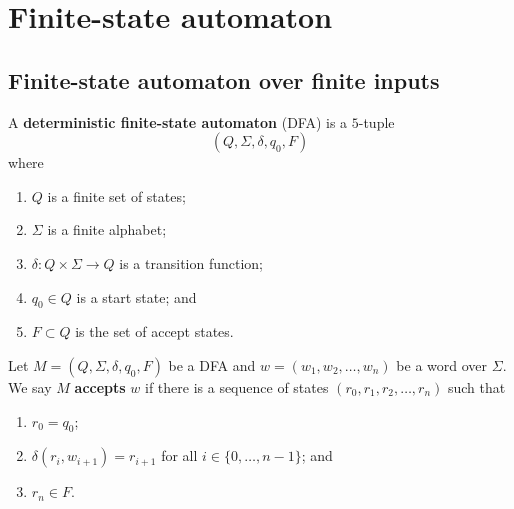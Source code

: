 \chapter{Finite-state automaton}
\section{Finite-state automaton over finite inputs}

\begin{definition}
    A \textbf{deterministic finite-state automaton} (DFA) is a $5$-tuple
    \[ (Q, \Sigma, \delta, q_0, F) \]
    where
    \begin{enumerate}
        \item $Q$ is a finite set of states;
        \item $\Sigma$ is a finite alphabet;
        \item $\delta: Q \times \Sigma \to Q$ is a transition function;
        \item $q_0 \in Q$ is a start state; and
        \item $F \subset Q$ is the set of accept states.
    \end{enumerate}
\end{definition}

\begin{definition}[]
    Let $M = (Q, \Sigma, \delta, q_0, F)$ be a DFA and
    $w = (w_1, w_2, \ldots, w_n)$ be a word over $\Sigma$.
    We say $M$ \textbf{accepts} $w$ if there is a sequence of states
    $(r_0, r_1, r_2, \ldots, r_n)$
    such that
    \begin{enumerate}
        \item $r_0 = q_0$;
        \item $\delta(r_i, w_{i + 1}) = r_{i + 1}$
            for all $i \in \{0, \ldots, n - 1\}$; and
        \item $r_n \in F$.
    \end{enumerate}
\end{definition}

